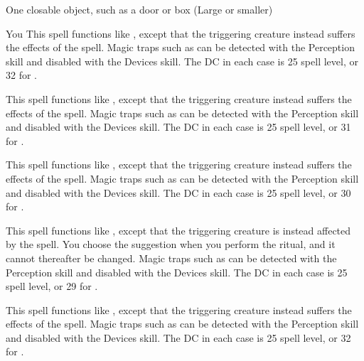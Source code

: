 \begin{spelltarget}{One closable object, such as a door or box (Large or smaller)}
\begin{spelltarget}{You}
\spelleffect This spell functions like , except that the triggering creature instead suffers the effects of the  spell.
\spellnotes Magic traps such as  can be detected with the Perception skill and disabled with the Devices skill. The DC in each case is 25 \add spell level, or 32 for .

\spelleffect This spell functions like , except that the triggering creature instead suffers the effects of the  spell.
\spellnotes Magic traps such as  can be detected with the Perception skill and disabled with the Devices skill. The DC in each case is 25 \add spell level, or 31 for .

\spelleffect This spell functions like , except that the triggering creature instead suffers the effects of the  spell.
\spellnotes Magic traps such as  can be detected with the Perception skill and disabled with the Devices skill. The DC in each case is 25 \add spell level, or 30 for .

\spelleffect This spell functions like , except that the triggering creature is instead affected by the  spell. You choose the suggestion when you perform the ritual, and it cannot thereafter be changed.
\spellnotes Magic traps such as  can be detected with the Perception skill and disabled with the Devices skill. The DC in each case is 25 \add spell level, or 29 for .

\spelleffect This spell functions like , except that the triggering creature instead suffers the effects of the  spell.
\spellnotes Magic traps such as  can be detected with the Perception skill and disabled with the Devices skill. The DC in each case is 25 \add spell level, or 32 for .


\end{spelltarget}
\end{spelltarget}
